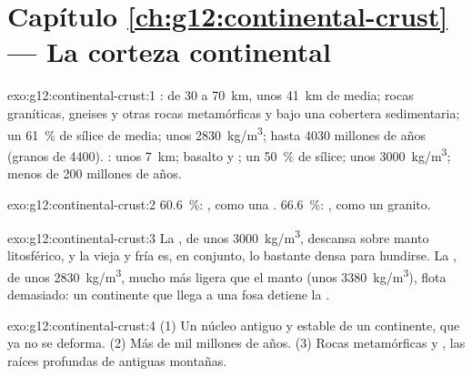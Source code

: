 \section*{Capítulo \ref{ch:g12:continental-crust} --- La corteza continental}

\begin{solution}{exo:g12:continental-crust:1}
: de 30 a \qty{70}{km}, unos \qty{41}{km} de media; rocas
graníticas, gneises y otras rocas metamórficas y  bajo una
cobertera sedimentaria; un \qty{61}{\percent} de sílice de media; unos
\qty{2830}{kg/m^3}; hasta 4030 millones de años (granos de 4400). : unos \qty{7}{km}; basalto y ; un \qty{50}{\percent} de sílice;
unos \qty{3000}{kg/m^3}; menos de 200 millones de años.
\end{solution}

\begin{solution}{exo:g12:continental-crust:2}
\qty{60.6}{\percent}: , como una . \qty{66.6}{\percent}:
, como un granito.
\end{solution}

\begin{solution}{exo:g12:continental-crust:3}
La , de unos \qty{3000}{kg/m^3}, descansa sobre manto
litosférico, y la  vieja y fría es, en conjunto, lo bastante
densa para hundirse. La , de unos \qty{2830}{kg/m^3},
mucho más ligera que el manto (unos \qty{3380}{kg/m^3}), flota demasiado: un
continente que llega a una fosa detiene la .
\end{solution}

\begin{solution}{exo:g12:continental-crust:4}
(1) Un núcleo antiguo y estable de un continente, que ya no se deforma. (2)
Más de mil millones de años. (3) Rocas metamórficas y , las raíces
profundas de antiguas montañas.
\end{solution}

